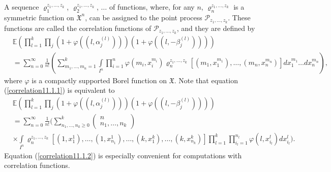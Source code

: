 \documentclass[12pt]{amsart}
\theoremstyle{definition}
\numberwithin{equation}{section}
\begin{document}
A sequence $\varrho_1^{z_1,\ldots,z_k}$, $\varrho_2^{z_1,\ldots,z_k}$,
$\ldots$ of functions, where, for any $n$, $\varrho_n^{z_1,\ldots,z_k}$ is a symmetric function on $\mathfrak{X}^n$, can be assigned to the point process $\mathcal{P}_{z_1,\ldots,z_k}$. These functions are called the correlation functions of $\mathcal{P}_{z_1,\ldots,z_k}$, and they are defined by
\begin{equation}\label{correlation11.1.1}
\begin{split}
&\mathbb{E}\left(\prod\limits_{l=1}^k\prod\limits_{j}
\left(1+\varphi\left(\left(l,\alpha_j^{(l)}\right)\right)\right)
\left(1+\varphi\left(\left(l,-\beta_j^{(l)}\right)\right)\right)\right)\\
&=\sum\limits_{n=0}^{\infty}\frac{1}{n!}
\left(\sum\limits_{m_1,\ldots,m_n=1}^k
\int\limits_{I^n}
\prod\limits_{i=1}^n\varphi\left(m_i,x_i^{m_i}\right)
\varrho_n^{z_1,\ldots,z_k}\left[\left(m_1,x_1^{m_1}\right),\ldots,\left(m_n,x_n^{m_n}\right)\right]dx_1^{m_1}\ldots dx_n^{m_n}\right),
\end{split}
\end{equation}
where $\varphi$ is a compactly supported Borel function on $\mathfrak{X}$.
Note that equation (\ref{correlation11.1.1}) is equivalent to
\begin{equation}\label{correlation11.1.2}
\begin{split}
&\mathbb{E}\left(\prod\limits_{l=1}^k\prod\limits_{j}
\left(1+\varphi\left(\left(l,\alpha_j^{(l)}\right)\right)\right)
\left(1+\varphi\left(\left(l,-\beta_j^{(l)}\right)\right)\right)\right)\\
&=\sum\limits_{n=0}^{\infty}\frac{1}{n!}
\biggl(\sum\limits_{n_1,\ldots,n_k\geq 0}^k
\left(\begin{array}{c}
  n\\
  n_1,\ldots,n_k
\end{array}\right)
\\
&
\times\int\limits_{I^n}\varrho_n^{z_1,\ldots,z_k}\left[
\left(1,x_1^{1}\right),\ldots,\left(1,x_{n_1}^{1}\right),
\ldots,\left(k,x_1^k\right),\ldots, \left(k,x_{n_k}^k\right)\right]
\prod\limits_{l=1}^k\prod\limits_{i_l=1}^{n_l}\varphi\left(l,x_{i_l}^{l}\right)dx_{i_l}^{l}\biggr).
\end{split}
\end{equation}
Equation (\ref{correlation11.1.2}) is especially convenient for computations with
correlation functions.
\end{document}
